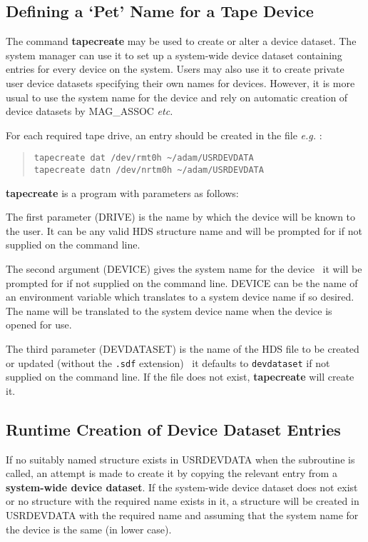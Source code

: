 \subsection{\label{tapecreate}Defining a `Pet' Name for a 
Tape Device}
The command {\bf tapecreate} may be used to create or alter a device dataset.
The system manager can use it to set up a system-wide device dataset
containing entries for every device on the system. Users may also use it to
create private user device datasets specifying their own names for devices.
However, it is more usual to use the system name for the device and rely on 
automatic creation of device datasets by MAG\_ASSOC {\em etc.}

For each required tape drive, an entry should be created in the file
{\em e.g.} :
\small \begin{quote}
\begin{verbatim}
tapecreate dat /dev/rmt0h ~/adam/USRDEVDATA
tapecreate datn /dev/nrtm0h ~/adam/USRDEVDATA
\end{verbatim}
\end{quote} \normalsize

{\bf tapecreate} is a
program with parameters as follows:

The first parameter (DRIVE) is the name by which the device will be known to 
the user. It can be any valid HDS structure name and will be prompted for if
not supplied on the command line.

The second argument (DEVICE) gives the system name for the device \dash\ it
will be prompted for if not supplied on the command line.
DEVICE can be the name of an environment variable which translates to a 
system device name if so desired. The name will be translated to the 
system device name when the device is opened for use.

The third parameter (DEVDATASET) is the name of the HDS file to be created or 
updated (without the {\tt.sdf} extension) \dash\ it defaults to 
{\tt devdataset} if not supplied on the command line.
If the file does not exist, {\bf tapecreate} will create it.

\subsection{Runtime Creation of Device Dataset Entries}
If no suitably named structure exists in USRDEVDATA when the 
subroutine is called, an attempt is made to create it by copying the relevant 
entry from a {\bf system-wide device dataset}. 
If the system-wide device dataset does not exist or no structure with the
required name exists in it, a structure will be created in USRDEVDATA with 
the required name and assuming that the system name for the device is the same
(in lower case).

